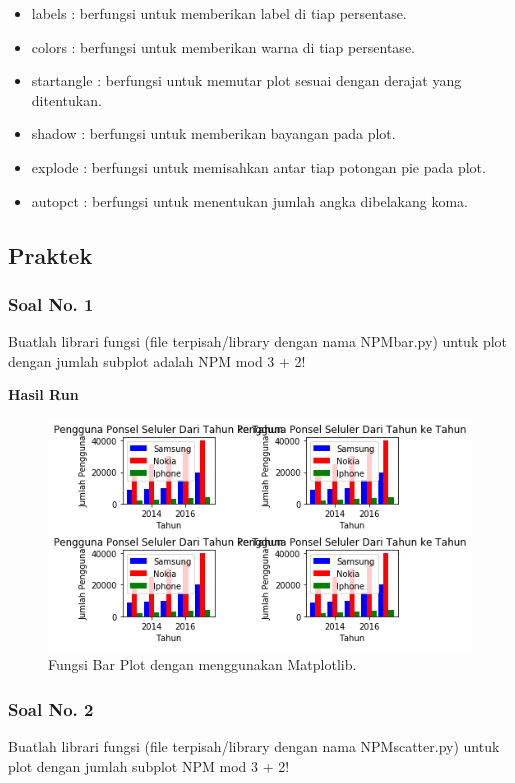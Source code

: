  \begin{itemize}
 	\item labels : berfungsi untuk memberikan label di tiap persentase.
 	\item colors : berfungsi untuk memberikan warna di tiap persentase.
 	\item startangle : berfungsi untuk memutar plot sesuai dengan derajat yang ditentukan.
 	\item shadow : berfungsi untuk memberikan bayangan pada plot.
 	\item explode : berfungsi untuk memisahkan antar tiap potongan pie pada plot.
 	\item autopct : berfungsi untuk menentukan jumlah angka dibelakang koma.
 \end{itemize}

\subsection{Praktek}
\subsubsection{Soal No. 1}
\hfill \break
Buatlah librari fungsi (file terpisah/library dengan nama NPMbar.py) untuk plot dengan jumlah subplot adalah NPM mod 3 + 2!



\hfill \break
\textbf{Hasil Run}

\begin{figure}[H]
	\includegraphics[width=12cm]{figures/6/1144124/a.png}
	\centering
	\caption{Fungsi Bar Plot dengan menggunakan Matplotlib.}
\end{figure}

\subsubsection{Soal No. 2}
\hfill \break
Buatlah librari fungsi (file terpisah/library dengan nama NPMscatter.py) untuk plot dengan jumlah subplot NPM mod 3 + 2!


